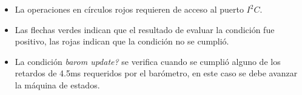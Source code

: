 \documentclass[main]{subfiles}
\begin{document}
\begin{itemize}
\item La operaciones en c\'irculos rojos requieren de acceso al puerto $I^2C$.
\item Las flechas verdes indican que el resultado de evaluar la condici\'on fue positivo, las rojas indican que la condici\'on no se cumpli\'o.
\item La condici\'on \textit{barom update?} se verifica cuando se cumpli\'o alguno de los retardos de 4.5ms requeridos por el bar\'ometro, en este caso se debe avanzar la m\'aquina de estados.
\end{itemize}
\end{document}
